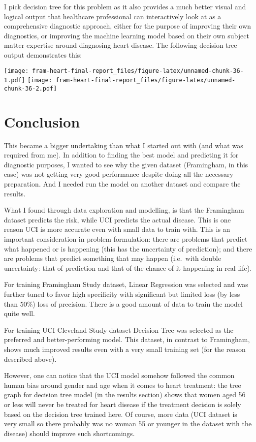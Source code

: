 \documentclass[]{article}
\begin{document}
I pick decision tree for this problem as it also provides a much better
visual and logical output that healthcare professional can interactively
look at as a comprehensive diagnostic approach, either for the purpose
of improving their own diagnostics, or improving the machine learning
model based on their own subject matter expertise around diagnosing
heart disease. The following decision tree output demonstrates this:

\texttt{[image: fram-heart-final-report\_files/figure-latex/unnamed-chunk-36-1.pdf]}
\texttt{[image: fram-heart-final-report\_files/figure-latex/unnamed-chunk-36-2.pdf]}

\section{Conclusion}\label{conclusion}

This became a bigger undertaking than what I started out with (and what
was required from me). In addition to finding the best model and
predicting it for diagnostic purposes, I wanted to see why the given
dataset (Framingham, in this case) was not getting very good performance
despite doing all the necessary preparation. And I needed run the model
on another dataset and compare the results.

What I found through data exploration and modelling, is that the
Framingham dataset predicts the risk, while UCI predicts the actual
disease. This is one reason UCI is more accurate even with small data to
train with. This is an important consideration in problem formulation:
there are problems that predict what happened or is happening (this has
the uncertainty of prediction); and there are problems that predict
something that may happen (i.e.~with double uncertainty: that of
prediction and that of the chance of it happening in real life).

For training Framingham Study dataset, Linear Regression was selected
and was further tuned to favor high specificity with significant but
limited loss (by less than 50\%) loss of precision. There is a good
amount of data to train the model quite well.

For training UCI Cleveland Study dataset Decision Tree was selected as
the preferred and better-performing model. This dataset, in contrast to
Framingham, shows much improved results even with a very small training
set (for the reason described above).

However, one can notice that the UCI model somehow followed the common
human bias around gender and age when it comes to heart treatment: the
tree graph for decision tree model (in the results section) shows that
women aged 56 or less will never be treated for heart disease if the
treatment decision is solely based on the decision tree trained here. Of
course, more data (UCI dataset is very small so there probably was no
woman 55 or younger in the dataset with the disease) should improve such
shortcomings.
\end{document}

